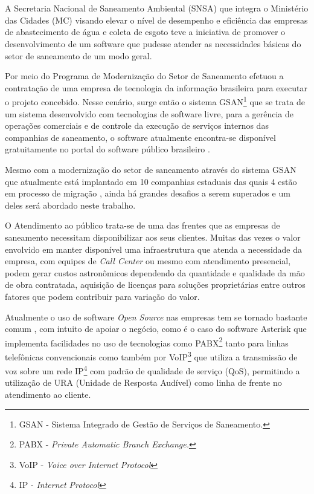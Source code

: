 \chapter[Introdução]{\fontsize{12}{1} }

A Secretaria Nacional de Saneamento Ambiental (SNSA) que integra o Ministério das Cidades (MC) visando elevar o nível de desempenho e eficiência das empresas de abastecimento de água e coleta de esgoto teve a iniciativa de promover o desenvolvimento de um software que pudesse atender as necessidades básicas do setor de saneamento de um modo geral.

Por meio do Programa de Modernização do Setor de Saneamento \cite{PMSS:2014} efetuou a contratação de uma empresa de tecnologia da informação brasileira para executar o projeto concebido.  Nesse cenário, surge então o sistema GSAN\footnote{GSAN - Sistema Integrado de Gestão de Serviços de Saneamento.} que se trata de um sistema desenvolvido com tecnologias de software livre, para a gerência de operações comerciais e de controle da execução de serviços internos das companhias de saneamento, o software atualmente encontra-se disponível gratuitamente no portal do software público brasileiro \cite{PORTAL:2014}. 

Mesmo com a modernização do setor de saneamento através do sistema GSAN que atualmente está implantado em 10 companhias estaduais das quais 4 estão em processo de migração \cite{PMSS:2014}, ainda há grandes desafios a serem superados e um deles será abordado neste trabalho.

O Atendimento ao público trata-se de uma das frentes que as empresas de saneamento necessitam disponibilizar aos seus clientes. Muitas das vezes o valor envolvido em manter disponível uma infraestrutura que atenda a necessidade da empresa, com equipes de \textit{Call Center} ou mesmo com atendimento presencial, podem gerar custos astronômicos dependendo da quantidade e qualidade da mão de obra contratada, aquisição de licenças para soluções proprietárias entre outros fatores que podem contribuir para variação do valor. 

Atualmente o uso de software \textit{Open Source} nas empresas tem se tornado bastante comum \cite{MEIRELLES2014}, com intuito de apoiar o negócio, como é o caso do software Asterisk que implementa facilidades no uso de tecnologias como PABX\footnote{PABX - \textit{Private Automatic Branch Exchange.}}  tanto para linhas telefônicas convencionais como também por VoIP\footnote{VoIP - \textit{Voice over Internet Protocol}} que utiliza a transmissão de voz sobre um rede IP\footnote{IP - \textit{Internet Protocol}} com padrão de qualidade de serviço (QoS), permitindo a utilização de URA (Unidade de Resposta Audível) \cite{VIEIRA:2007} como linha de frente no atendimento ao cliente.


